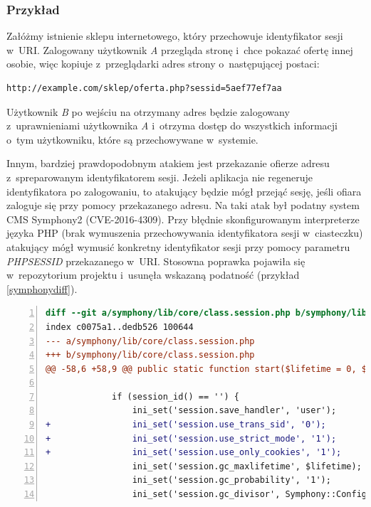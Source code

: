 \documentclass[12pt,a4paper,polish,thesis]{dcsbook}
\begin{document}
\subsubsection*{Przykład}
Załóżmy istnienie sklepu internetowego, który przechowuje identyfikator sesji w~URI. Zalogowany użytkownik \textit{A} przegląda stronę i~chce pokazać ofertę innej osobie, więc kopiuje z~przeglądarki adres strony o~następującej postaci:
\begin{lstlisting}
http://example.com/sklep/oferta.php?sessid=5aef77ef7aa
\end{lstlisting}
Użytkownik \textit{B} po wejściu na otrzymany adres będzie zalogowany z~uprawnieniami użytkownika \textit{A} i~otrzyma dostęp do wszystkich informacji o~tym użytkowniku, które są przechowywane w~systemie.

Innym, bardziej prawdopodobnym atakiem jest przekazanie ofierze adresu z~spreparowanym identyfikatorem sesji. Jeżeli aplikacja nie regeneruje identyfikatora po zalogowaniu, to atakujący będzie mógł przejąć sesję, jeśli ofiara zaloguje się przy pomocy przekazanego adresu. Na taki atak był podatny system CMS Symphony2 (CVE-2016-4309). Przy błędnie skonfigurowanym interpreterze języka PHP (brak wymuszenia przechowywania identyfikatora sesji w~ciasteczku) atakujący mógł wymusić konkretny identyfikator sesji przy pomocy parametru \textit{PHPSESSID} przekazanego w~URI. Stosowna poprawka pojawiła się w~repozytorium projektu i~usunęła wskazaną podatność (przykład \ref{symphonydiff}).

\begin{lstlisting}[language=diff,frame=single,caption=łatka naprawiająca podatność fiksacji sesji w~Symphony2 \cite{symphony},label=symphonydiff,numbers=left]
diff --git a/symphony/lib/core/class.session.php b/symphony/lib/core/class.session.php
index c0075a1..dedb526 100644
--- a/symphony/lib/core/class.session.php
+++ b/symphony/lib/core/class.session.php
@@ -58,6 +58,9 @@ public static function start($lifetime = 0, $path = '/', $domain = null, $httpOn
 
             if (session_id() == '') {
                 ini_set('session.save_handler', 'user');
+                ini_set('session.use_trans_sid', '0');
+                ini_set('session.use_strict_mode', '1');
+                ini_set('session.use_only_cookies', '1');
                 ini_set('session.gc_maxlifetime', $lifetime);
                 ini_set('session.gc_probability', '1');
                 ini_set('session.gc_divisor', Symphony::Configuration()->get('session_gc_divisor', 'symphony'));
\end{lstlisting}
\end{document}
